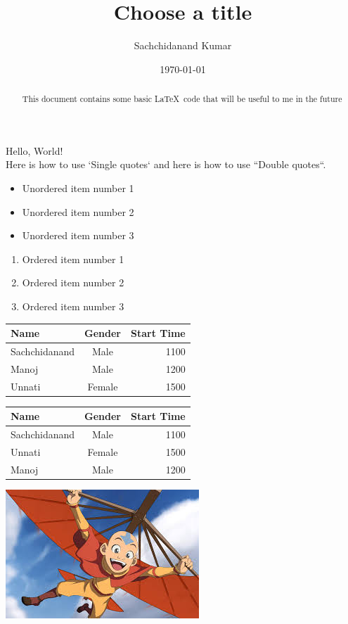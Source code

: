 \documentclass{article} %
\title{Choose a title}
\author{Sachchidanand Kumar}
\date{\today}
\begin{document}

\begin{abstract}
    This document contains some basic \LaTeX~code that will be useful to me in the future 
\end{abstract}

\maketitle

Hello, World!\\
Here is how to use `Single quotes` and here is how to use  ``Double quotes``.

\begin{itemize}
    \item Unordered item number 1
    \item Unordered item number 2
    \item Unordered item number 3
\end{itemize}

\begin{enumerate}
    \item Ordered item number 1
    \item Ordered item number 2
    \item Ordered item number 3
\end{enumerate}

\begin{tabular}{|l|c|r|}
     \hline
     Name  &  Gender  & Start Time \\
     \hline
     Sachchidanand  &  Male  &  1100\\
     \hline
     Manoj  &  Male  &  1200\\
     \hline
     Unnati  & Female  &  1500\\
     \hline
\end{tabular}

\begin{tabular}{l|c|r}
     \\
     \toprule
     Name & Gender & Start Time\\
     \midrule
     Sachchidanand & Male & 1100\\
     Unnati & Female & 1500\\
     Manoj & Male & 1200\\
     \bottomrule
\end{tabular}

\begin{center}
    \includegraphics[width=.6\textwidth]{ange.jpg}
\end{center}
\end{document}

